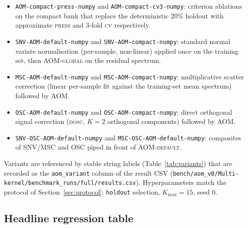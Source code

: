 \documentclass[review,a4paper]{elsarticle}
\newcommand{\AOM}{\textsc{AOM}\xspace}
\newcommand{\PLS}{\textsc{PLS}\xspace}
\newcommand{\SNV}{\textsc{SNV}\xspace}
\newcommand{\MSC}{\textsc{MSC}\xspace}
\newcommand{\OSC}{\textsc{OSC}\xspace}
\begin{document}
\begin{itemize}[leftmargin=2em,itemsep=0pt]
        grammar (Section~\ref{sec:algo-explorer}).
  \item \texttt{AOM-compact-press-numpy} and
        \texttt{AOM-compact-cv3-numpy}: criterion ablations on the
        compact bank that replace the deterministic 20\% holdout with
        approximate \textsc{press} and 3-fold \textsc{cv} respectively.
  \item \texttt{SNV-AOM-default-numpy} and
        \texttt{SNV-AOM-compact-numpy}: standard normal variate
        normalisation (per-sample, non-linear) applied once on the
        training set, then \AOM-\textsc{global} on the residual
        spectrum.
  \item \texttt{MSC-AOM-default-numpy} and
        \texttt{MSC-AOM-compact-numpy}: multiplicative scatter
        correction (linear per-sample fit against the training-set
        mean spectrum) followed by \AOM.
  \item \texttt{OSC-AOM-default-numpy} and
        \texttt{OSC-AOM-compact-numpy}: direct orthogonal signal
        correction (\textsc{dosc}, $K{=}2$ orthogonal components)
        followed by \AOM.
  \item \texttt{SNV-OSC-AOM-default-numpy} and
        \texttt{MSC-OSC-AOM-default-numpy}: composites of \SNV/\MSC
        and \OSC piped in front of \AOM-\textsc{default}.
\end{itemize}

Variants are referenced by stable string labels (Table~\ref{tab:variants})
that are recorded as the \verb|aom_variant| column of the result CSV
(\verb|bench/aom_v0/Multi-kernel/benchmark_runs/full/results.csv|). Hyperparameters
match the protocol of Section~\ref{sec:protocol}: \texttt{holdout}
selection, $K_\text{max}{=}15$, seed $0$.

\subsection{Headline regression table}

\begin{table}[t]
\centering
\caption{Regression benchmark across the 57-dataset cohort
(criterion=\textsc{holdout} unless noted, $K_\text{max}=15$, seed=0).
\emph{Wins / N} counts datasets on which the variant strictly beats
\PLS-standard. \emph{Median RMSEP / PLS} is the per-dataset RMSEP
normalised by \PLS-standard then aggregated by median across datasets;
values below~1 indicate a win against standard \PLS. The
\texttt{nirs4all-AOM-PLS} row is the deployed reference, not a
competitor of the framework rows: the framework's
\texttt{AOM-default-nipals-adjoint} row reproduces its $b^\star$ and
$k^\star$ on the parity cohort and matches its cohort RMSEPs within
floating-point tolerance (Section~\ref{sec:bit-parity}; max absolute
prediction divergence $4.37\times10^{-11}$ in the parity test).
Generated from \texttt{publication/tables/relative\_rmsep\_per\_variant.csv}.}
\label{tab:reg-extended}

\end{table}
\end{document}
